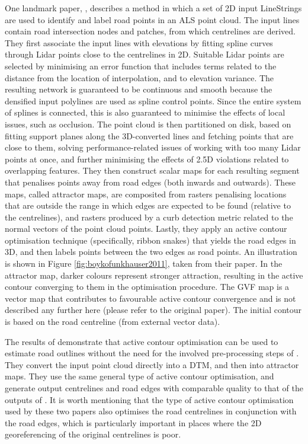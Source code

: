One landmark paper, \cite{boyko_funkhauser_2011}, describes a method in which a set of 2D input LineStrings are used to identify and label road points in an ALS point cloud. The input lines contain road intersection nodes and patches, from which centrelines are derived. They first associate the input lines with elevations by fitting spline curves through Lidar points close to the centrelines in 2D. Suitable Lidar points are selected by minimising an error function that includes terms related to the distance from the location of interpolation, and to elevation variance. The resulting network is guaranteed to be continuous and smooth because the densified input polylines are used as spline control points. Since the entire system of splines is connected, this is also guaranteed to minimise the effects of local issues, such as occlusion. The point cloud is then partitioned on disk, based on fitting support planes along the 3D-converted lines and fetching points that are close to them, solving performance-related issues of working with too many Lidar points at once, and further minimising the effects of 2.5D violations related to overlapping features. They then construct scalar maps for each resulting segment that penalises points away from road edges (both inwards and outwards). These maps, called attractor maps, are composited from rasters penalising locations that are outside the range in which edges are expected to be found (relative to the centrelines), and rasters produced by a curb detection metric related to the normal vectors of the point cloud points. Lastly, they apply an active contour optimisation technique (specifically, ribbon snakes) that yields the road edges in 3D, and then labels points between the two edges as road points. An illustration is shown in Figure \ref{fig:boykofunkhauser2011}, taken from their paper. In the attractor map, darker colours represent stronger attraction, resulting in the active contour converging to them in the optimisation procedure. The GVF map is a vector map that contributes to favourable active contour convergence and is not described any further here (please refer to the original paper). The initial contour is based on the road centreline (from external vector data).

The results of \cite{gopfert_etal_2011} demonstrate that active contour optimisation can be used to estimate road outlines without the need for the involved pre-processing steps of \cite{boyko_funkhauser_2011}. They convert the input point cloud directly into a DTM, and then into attractor maps. They use the same general type of active contour optimisation, and generate output centrelines and road edges with comparable quality to that of the outputs of \cite{boyko_funkhauser_2011}. It is worth mentioning that the type of active contour optimisation used by these two papers also optimises the road centrelines in conjunction with the road edges, which is particularly important in places where the 2D georeferencing of the original centrelines is poor.

